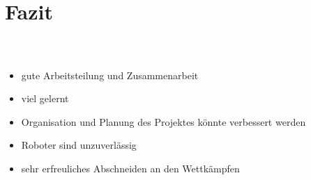 \section{Fazit}

\begin{frame}
\frametitle{\,}

\begin{itemize}
	\item gute Arbeitsteilung und Zusammenarbeit
	\item viel gelernt
	\item Organisation und Planung des Projektes könnte verbessert werden
	\item Roboter sind unzuverlässig
	\item sehr erfreuliches Abschneiden an den Wettkämpfen
\end{itemize}
\end{frame}   